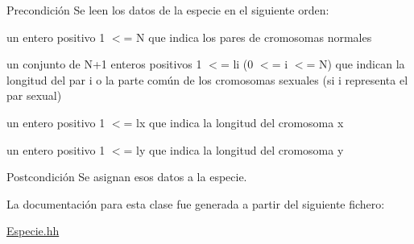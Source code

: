 \begin{DoxyPrecond}{Precondición}
Se leen los datos de la especie en el siguiente orden\+:
\begin{DoxyEnumerate}
\item un entero positivo 1 $<$= N que indica los pares de cromosomas normales
\item un conjunto de N+1 enteros positivos 1 $<$= li (0 $<$= i $<$= N) que indican la longitud del par i o la parte común de los cromosomas sexuales (si i representa el par sexual)
\item un entero positivo 1 $<$= lx que indica la longitud del cromosoma x
\item un entero positivo 1 $<$= ly que indica la longitud del cromosoma y
\end{DoxyEnumerate}
\end{DoxyPrecond}
\begin{DoxyPostcond}{Postcondición}
Se asignan esos datos a la especie. 
\end{DoxyPostcond}


La documentación para esta clase fue generada a partir del siguiente fichero\+:\begin{DoxyCompactItemize}
\item 
\hyperlink{_especie_8hh}{Especie.\+hh}\end{DoxyCompactItemize}
